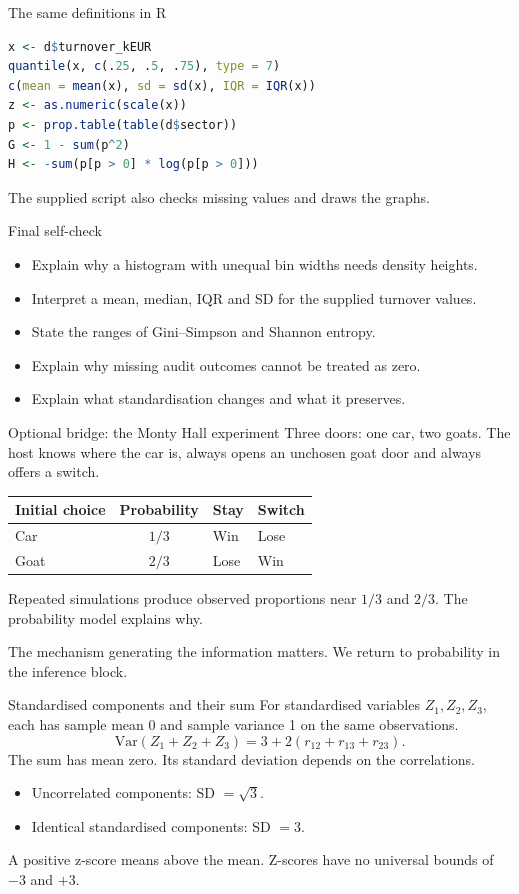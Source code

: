 \begin{frame}[fragile]{The same definitions in R}
\begin{lstlisting}[language=R]
x <- d$turnover_kEUR
quantile(x, c(.25, .5, .75), type = 7)
c(mean = mean(x), sd = sd(x), IQR = IQR(x))
z <- as.numeric(scale(x))
p <- prop.table(table(d$sector))
G <- 1 - sum(p^2)
H <- -sum(p[p > 0] * log(p[p > 0]))
\end{lstlisting}
The supplied script also checks missing values and draws the graphs.
\end{frame}
\begin{frame}{Final self-check}
\begin{itemize}
\item Explain why a histogram with unequal bin widths needs density heights.
\item Interpret a mean, median, IQR and SD for the supplied turnover values.
\item State the ranges of Gini--Simpson and Shannon entropy.
\item Explain why missing audit outcomes cannot be treated as zero.
\item Explain what standardisation changes and what it preserves.
\end{itemize}
\end{frame}

\begin{frame}{Optional bridge: the Monty Hall experiment}
\small
Three doors: one car, two goats. The host knows where the car is, always opens an unchosen goat door and always offers a switch.
\begin{center}\begin{tabular}{lcll}\toprule
Initial choice & Probability & Stay & Switch\\\midrule
Car & $1/3$ & Win & Lose\\
Goat & $2/3$ & Lose & Win\\\bottomrule
\end{tabular}\end{center}
Repeated simulations produce observed proportions near $1/3$ and $2/3$. The probability model explains why.
\par\vspace{3mm}
The mechanism generating the information matters. We return to probability in the inference block.
\end{frame}

\begin{frame}{Standardised components and their sum}
For standardised variables $Z_1,Z_2,Z_3$, each has sample mean 0 and sample variance 1 on the same observations.
\[\mathrm{Var}(Z_1+Z_2+Z_3)=3+2(r_{12}+r_{13}+r_{23}).\]
The sum has mean zero. Its standard deviation depends on the correlations.
\begin{itemize}
\item Uncorrelated components: SD $=\sqrt{3}$.
\item Identical standardised components: SD $=3$.
\end{itemize}
A positive z-score means above the mean. Z-scores have no universal bounds of $-3$ and $+3$.
\end{frame}

